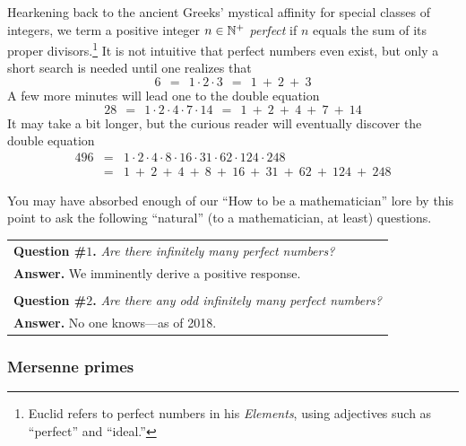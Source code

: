 Hearkening back to the ancient Greeks' mystical affinity for special
classes of integers, we term a positive integer $n \in \mathbb{N}^+$ {\it
  perfect} 
if $n$ equals the sum of its proper divisors.\footnote{Euclid refers
  to perfect numbers in his {\it Elements}, using adjectives such as
  ``perfect'' and ``ideal.''}  
It is not intuitive that perfect numbers even exist, but only a short
search is needed until one realizes that
\[ 6 \ \ = \ \ 1 \cdot 2 \cdot 3 \ \ = \ \ 1 \ +\ 2 \ + \ 3 \]
A few more minutes will lead one to the double equation
\[ 28  \ \ = \ \ 1 \cdot 2 \cdot 4 \cdot 7 \cdot 14
  \ \ = \ \ 1 \ + \ 2 \ + \ 4 \ + \ 7\ + \ 14 \]
It may take a bit longer, but the curious reader will eventually
discover the double equation
\begin{eqnarray*}
496 & = & 
1 \cdot 2 \cdot 4 \cdot 8 \cdot 16 \cdot 31 \cdot 62 \cdot 124 \cdot
248 \\
 & = &
1 \ + \ 2 \ + \ 4 \ + \ 8 \ + \ 16 \ + \ 31 \ + \ 62 \ + \ 124 \ + \ 248
\end{eqnarray*}

You may have absorbed enough of our ``How to be a mathematician'' lore
by this point to ask the following ``natural'' (to a mathematician, at
least) questions.

\smallskip

\begin{tabular}{l}
{\bf Question \#$1$.}  {\em Are there {\em infinitely many} perfect numbers?} \\
{\bf Answer.}  We imminently derive a positive response. \\
 \\
{\bf Question \#$2$.}  {\em Are there any {\em odd} infinitely many perfect numbers?} \\
{\bf Answer.}  No one knows---as of 2018.
\end{tabular}

\subsubsection{Mersenne primes}
\label{sec:Mersenne-primes}

